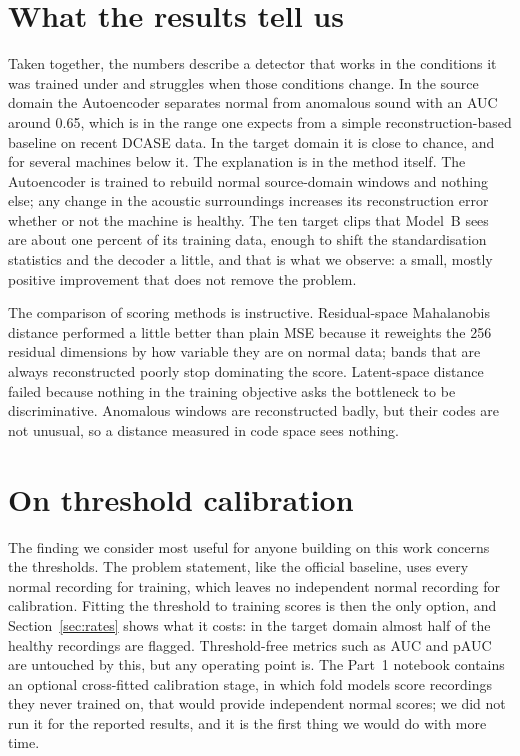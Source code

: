 \section{What the results tell us}
Taken together, the numbers describe a detector that works in the conditions it was trained under and struggles when those conditions change. In the source domain the Autoencoder separates normal from anomalous sound with an AUC around 0.65, which is in the range one expects from a simple reconstruction-based baseline on recent DCASE data. In the target domain it is close to chance, and for several machines below it. The explanation is in the method itself. The Autoencoder is trained to rebuild normal source-domain windows and nothing else; any change in the acoustic surroundings increases its reconstruction error whether or not the machine is healthy. The ten target clips that Model~B sees are about one percent of its training data, enough to shift the standardisation statistics and the decoder a little, and that is what we observe: a small, mostly positive improvement that does not remove the problem.

The comparison of scoring methods is instructive. Residual-space Mahalanobis distance performed a little better than plain MSE because it reweights the 256 residual dimensions by how variable they are on normal data; bands that are always reconstructed poorly stop dominating the score. Latent-space distance failed because nothing in the training objective asks the bottleneck to be discriminative. Anomalous windows are reconstructed badly, but their codes are not unusual, so a distance measured in code space sees nothing.

\section{On threshold calibration}
The finding we consider most useful for anyone building on this work concerns the thresholds. The problem statement, like the official baseline, uses every normal recording for training, which leaves no independent normal recording for calibration. Fitting the threshold to training scores is then the only option, and Section~\ref{sec:rates} shows what it costs: in the target domain almost half of the healthy recordings are flagged. Threshold-free metrics such as AUC and pAUC are untouched by this, but any operating point is. The Part~1 notebook contains an optional cross-fitted calibration stage, in which fold models score recordings they never trained on, that would provide independent normal scores; we did not run it for the reported results, and it is the first thing we would do with more time.

